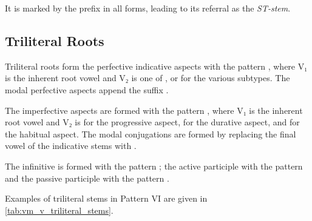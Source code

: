 \documentclass[grammar]{subfiles}
\begin{document}
It is marked by the prefix  in all forms, leading to its referral as the \emph{ST-stem}. 


\subsection{Triliteral Roots}
\label{ssec:vm_vi_triliteral_roots}

Triliteral roots form the perfective indicative aspects with the pattern
, where V₁ is the inherent root vowel and V₂ is one of
,  or  for the various subtypes.  The modal perfective
aspects append the suffix . 

The imperfective aspects are formed with the pattern ,
where V₁ is the inherent root vowel and V₂ is  for the progressive
aspect,  for the durative aspect, and  for the habitual aspect.
The modal conjugations are formed by replacing the final vowel of the
indicative stems with . 

The infinitive is formed with the pattern ; the active participle
with the pattern  and the passive participle with the pattern
. 

Examples of triliteral stems in Pattern VI are given in \cref{tab:vm_v_triliteral_stems}. 
\end{document}
